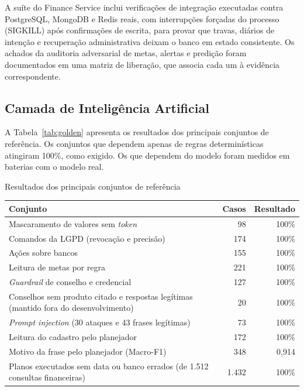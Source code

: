 A suíte do Finance Service inclui verificações de integração executadas contra PostgreSQL, MongoDB e Redis reais, com interrupções forçadas do processo (SIGKILL) após confirmações de escrita, para provar que travas, diários de intenção e recuperação administrativa deixam o banco em estado consistente. Os achados da auditoria adversarial de metas, alertas e predição foram documentados em uma matriz de liberação, que associa cada um à evidência correspondente.

\subsection{Camada de Inteligência Artificial}

A Tabela~\ref{tab:golden} apresenta os resultados dos principais conjuntos de referência. Os conjuntos que dependem apenas de regras determinísticas atingiram 100\%, como exigido. Os que dependem do modelo foram medidos em baterias com o modelo real.

\begin{tabela}[H]
\centering
\caption{Resultados dos principais conjuntos de referência}
\label{tab:golden}
{\small
\begin{tabular}{L{6.3cm}rr}
\toprule
\textbf{Conjunto} & \textbf{Casos} & \textbf{Resultado} \\
\midrule
Mascaramento de valores sem \textit{token} & 98 & 100\% \\
Comandos da LGPD (revocação e precisão) & 174 & 100\% \\
Ações sobre bancos & 155 & 100\% \\
Leitura de metas por regra & 221 & 100\% \\
\textit{Guardrail} de conselho e credencial & 127 & 100\% \\
Conselhos sem produto citado e respostas legítimas (mantido fora do desenvolvimento) & 20 & 100\% \\
\textit{Prompt injection} (30 ataques e 43 frases legítimas) & 73 & 100\% \\
Leitura do cadastro pelo planejador & 172 & 100\% \\
Motivo da frase pelo planejador (Macro-F1) & 348 & 0,914 \\
Planos executados sem data ou banco errados (de 1.512 consultas financeiras) & 1.432 & 100\% \\
\bottomrule
\end{tabular}
}
\authorssource
\end{tabela}


